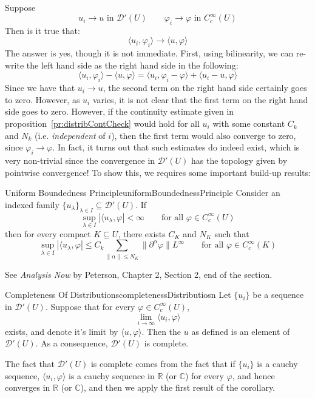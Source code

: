 \documentclass{book}
\newenvironment{Proof}[1][]
  {\begin{ProofTcb}[#1]}
  {\end{ProofTcb}}
\newcommand{\R}{{\mathbb{R}}}
\newcommand{\C}{{\mathbb{C}}}
\newcommand{\CD}{{\mathcal{D}}}
\newcommand{\sse}{\subseteq}
\renewcommand{\phi}{\varphi}
\newcommand{\rw}{\rightarrow}
\begin{document}
Suppose
\[
	u_i \rw u \text{ in } \CD'(U) \qquad \phi_i \rw \phi \text{ in } C_c^\infty(U)
\]
Then is it true that:
\[
	\langle u_i, \phi_i\rangle \rw \langle u, \phi\rangle
\]
The answer is yes, though it is not immediate. First, using bilinearity, we can re-write the left hand side as the right
hand side in the following:
\[
	\langle u_i, \phi_i \rangle - \langle u,\phi \rangle = \langle u_i, \phi_i - \phi \rangle + \langle u_i - u, \phi\rangle
\]
Since we have that $u_i \rw u$, the second term on the right hand side certainly goes to zero. However, as $u_i$ varies,
it is not clear that the first term on the right hand side goes to zero. However, if the continuity estimate given in
proposition~\ref{pr:distribContCheck} would hold for all $u_i$ with some constant $C_k$ and $N_k$ (i.e.
\emph{independent} of $i$), then the first term would also converge to zero, since $\phi_i \rw \phi$. In fact, it turns
out that such estimates do indeed exist, which is very non-trivial since the convergence in $\CD'(U)$ has the topology
given by pointwise convergence! To show this, we requires some important build-up results:

\begin{thm}{Uniform Boundedness Principle}{uniformBoundednessPrinciple}
	Consider an indexed family $\{u_\lambda\}_{\lambda \in I} \sse \CD'(U)$. If
	\[
		\sup_{\lambda \in I}|\langle u_\lambda, \phi | < \infty \qquad \text{for all $\phi \in C_c^\infty(U)$}
	\]
	then for every compact $K \sse U$, there exists $C_K$ and $N_K$ such that
	\[
		\sup_{\lambda \in I}|\langle u_\lambda, \phi | \le C_k \sum_{\|\alpha\| \le N_K} \|  \partial^\alpha \phi\| L^\infty \qquad \text{for all $\phi \in C_c^\infty(K)$}
	\]
\end{thm}

\begin{Proof}
	See \emph{Analysis Now} by Peterson, Chapter 2, Section 2, end of the section.
\end{Proof}

\begin{cor}{Completeness Of Distributions}{completenessDistributiosn}
	Let $\{u_i\}$ be a sequence in $\CD'(U)$. Suppose that for every $\phi \in C_c^\infty(U)$,
	\[
		\lim_{i \rw \infty} \langle u_i, \phi\rangle
	\]
	exists, and denote it's limit by $\langle u, \phi\rangle$. Then the $u$ as defined is an element of $\CD'(U)$. As
	a consequence, $\CD'(U)$ is complete.
\end{cor}

\begin{Proof}
	The fact that $\CD'(U)$ is complete comes from the fact that if $\{u_i\}$ is a cauchy sequence, $\langle u_i, \phi
	\rangle$ is a cauchy sequence in $\R$ (or $\C$) for every $\phi$, and hence converges in $\R$ (or $\C$), and then we
	apply the first result of the corollary.
\end{Proof}
\end{document}

